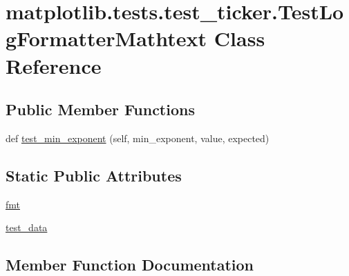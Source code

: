 \hypertarget{classmatplotlib_1_1tests_1_1test__ticker_1_1TestLogFormatterMathtext}{}\section{matplotlib.\+tests.\+test\+\_\+ticker.\+Test\+Log\+Formatter\+Mathtext Class Reference}
\label{classmatplotlib_1_1tests_1_1test__ticker_1_1TestLogFormatterMathtext}
\subsection*{Public Member Functions}
\begin{DoxyCompactItemize}
\item 
def \hyperlink{classmatplotlib_1_1tests_1_1test__ticker_1_1TestLogFormatterMathtext_aba3490b1a7e03c60864eb3f42d59b222}{test\+\_\+min\+\_\+exponent} (self, min\+\_\+exponent, value, expected)
\end{DoxyCompactItemize}
\subsection*{Static Public Attributes}
\begin{DoxyCompactItemize}
\item 
\hyperlink{classmatplotlib_1_1tests_1_1test__ticker_1_1TestLogFormatterMathtext_a17ca62b4c3fe814121acf8dc0b42b592}{fmt}
\item 
\hyperlink{classmatplotlib_1_1tests_1_1test__ticker_1_1TestLogFormatterMathtext_afe3616a413d28e8d1909575b5cd90808}{test\+\_\+data}
\end{DoxyCompactItemize}


\subsection{Member Function Documentation}
\mbox{\label{classmatplotlib_1_1tests_1_1test__ticker_1_1TestLogFormatterMathtext_aba3490b1a7e03c60864eb3f42d59b222}} 
